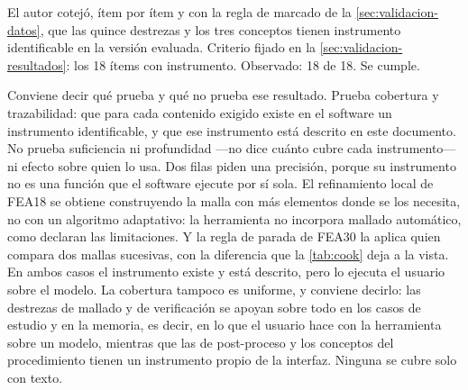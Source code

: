 {\singlespacing{}}

El autor cotejó, ítem por ítem y con la regla de marcado de la \autoref{sec:validacion-datos}, que las quince destrezas y los tres conceptos tienen instrumento identificable en la versión evaluada. Criterio fijado en la \autoref{sec:validacion-resultados}: los 18 ítems con instrumento. Observado: 18 de 18. Se cumple.

Conviene decir qué prueba y qué no prueba ese resultado. Prueba cobertura y trazabilidad: que para cada contenido exigido existe en el software un instrumento identificable, y que ese instrumento está descrito en este documento. No prueba suficiencia ni profundidad —no dice cuánto cubre cada instrumento— ni efecto sobre quien lo usa. Dos filas piden una precisión, porque su instrumento no es una función que el software ejecute por sí sola. El refinamiento local de FEA18 se obtiene construyendo la malla con más elementos donde se los necesita, no con un algoritmo adaptativo: la herramienta no incorpora mallado automático, como declaran las limitaciones. Y la regla de parada de FEA30 la aplica quien compara dos mallas sucesivas, con la diferencia que la \autoref{tab:cook} deja a la vista. En ambos casos el instrumento existe y está descrito, pero lo ejecuta el usuario sobre el modelo. La cobertura tampoco es uniforme, y conviene decirlo: las destrezas de mallado y de verificación se apoyan sobre todo en los casos de estudio y en la memoria, es decir, en lo que el usuario hace con la herramienta sobre un modelo, mientras que las de post-proceso y los conceptos del procedimiento tienen un instrumento propio de la interfaz. Ninguna se cubre solo con texto.


